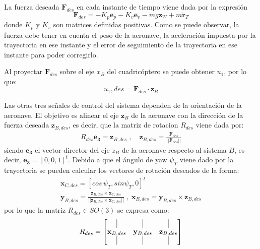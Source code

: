 La fuerza deseada $\mathbf{F}_{des}$ en cada instante de tiempo viene dada por la expresión
\begin{equation}
	\mathbf{F}_{des} = -K_p	\mathbf{e}_p - K_v	\mathbf{e}_v - mg	\mathbf{z}_W + m	\mathbf{\ddot r}_T
\end{equation}
donde $K_p$ y $K_v$ son matrices definidas positivas.
Como se puede observar, la fuerza debe tener en cuenta el peso de la aeronave, la aceleración impuesta por la trayectoria en ese instante y el error de seguimiento de la trayectoria en ese instante para poder corregirlo.

Al proyectar $\mathbf{F}_{des}$ sobre el eje $x_B$ del cuadricóptero se puede obtener $u_1$, por lo que:
\begin{equation}
	u_1,des = \mathbf{F}_{des}\cdot \mathbf{z}_B
\end{equation}

Las otras tres señales de control del sistema dependen de la orientación de la aeronave. El objetivo es alinear el eje $\mathbf{z}_B$ de la aeronave con la dirección de la fuerza deseada $\mathbf{z}_{B,des}$, es decir, que la matriz de rotacion $R_{des}$ viene dada por:
\begin{align}	
	R_{des}\mathbf{e_3} = \mathbf{z}_{B,des}\;,\quad 
\mathbf{z}_{B,des} = \frac{\mathbf{F}_{des}}{||\mathbf{F}_{des}||}
\end{align}
siendo $\mathbf{e_3}$ el vector director del eje $z_B$ de la aeronave respecto al sistema $B$, es decir, $\mathbf{e_3} = [0, 0, 1]^t$.
Debido a que el ángulo de yaw $\psi_T$ viene dado por la trayectoria se pueden calcular los vectores de rotación deseados de la forma:
\begin{gather}
	\mathbf{x}_{C,des} = [cos\, \psi_T , sin \psi_T, 0]^t\\
	\mathbf{y}_{B,des} = \frac{\mathbf{z}_{B,des}\times\mathbf{x}_{C,des}}{||\mathbf{z}_{B,des}\times\mathbf{x}_{C,des}||}\;,\; \mathbf{x}_{B,des} = \mathbf{y}_{B,des} \times\mathbf{z}_{B,des}
\end{gather}
por lo que la matriz $R_{des} \in SO(3)$ se expresa como:
\begin{equation}
	R_{des}=
	\begin{bmatrix}
		\vrule&\vrule&\vrule\\
		\mathbf{x}_{B,des}&\mathbf{y}_{B,des}&\mathbf{z}_{B,des}\\
		\vrule&\vrule&\vrule
	\end{bmatrix}
\end{equation}

